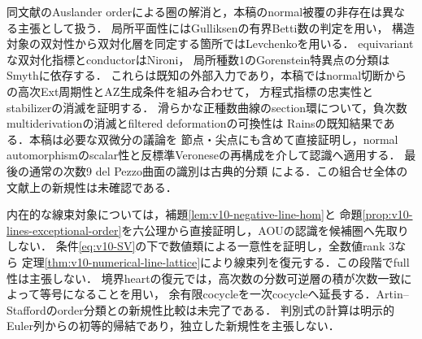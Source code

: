 \documentclass[11pt,a4paper]{ltjsarticle}
\begin{document}
同文献のAuslander orderによる圏の解消と，本稿のnormal被覆の非存在は異なる主張として扱う．
局所平面性にはGulliksen\cite[Proposition 6]{Gulliksen1967}の有界Betti数の判定を用い，
構造対象の双対性から双対化層を同定する箇所ではLevchenko\cite[Proposition 2]{Levchenko}を用いる．
equivariantな双対化指標とconductorはNironi\cite{NironiDuality}，
局所種数1のGorenstein特異点の分類はSmyth\cite[Appendix A, Proposition A.3]{SmythGenusOne}に依存する．
これらは既知の外部入力であり，本稿ではnormal切断からの高次Ext周期性とAZ生成条件を組み合わせて，
方程式指標の忠実性とstabilizerの消滅を証明する．
滑らかな正種数曲線のsection環について，負次数multiderivationの消滅とfiltered deformationの可換性は
Rains\cite[Corollaries 2.5--2.6]{RainsFiltered}の既知結果である．本稿は必要な双微分の議論を
節点・尖点にも含めて直接証明し，normal automorphismのscalar性と反標準Veroneseの再構成を介して認識へ適用する．
最後の通常の次数9 del Pezzo曲面の識別は古典的分類
\cite[\S2.1, \S3.1.1]{DolgachevMartin}による．この組合せ全体の文献上の新規性は未確認である．

内在的な線束対象については，補題\ref{lem:v10-negative-line-hom}と
命題\ref{prop:v10-lines-exceptional-order}を六公理から直接証明し，AOUの認識を候補圏へ先取りしない．
条件\eqref{eq:v10-SV}の下で数値類による一意性を証明し，全数値rank $3$なら
定理\ref{thm:v10-numerical-line-lattice}により線束列を復元する．この段階でfull性は主張しない．
境界heartの復元では，高次数の分数可逆層の積が次数一致によって等号になることを用い，
余有限cocycleを一次cocycleへ延長する．Artin--Staffordのorder分類との新規性比較は未完了である．
判別式の計算は明示的Euler列からの初等的帰結であり，独立した新規性を主張しない．
\end{document}

